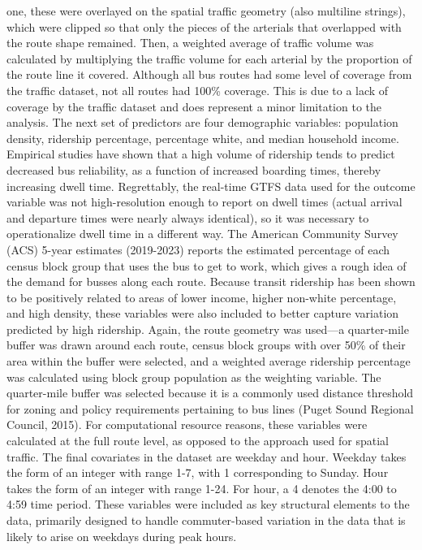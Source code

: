 \documentclass[
  12pt,
]{article}
\begin{document}
one, these were overlayed on the spatial traffic geometry (also
multiline strings), which were clipped so that only the pieces of the
arterials that overlapped with the route shape remained. Then, a
weighted average of traffic volume was calculated by multiplying the
traffic volume for each arterial by the proportion of the route line it
covered. Although all bus routes had some level of coverage from the
traffic dataset, not all routes had 100\% coverage. This is due to a
lack of coverage by the traffic dataset and does represent a minor
limitation to the analysis. The next set of predictors are four
demographic variables: population density, ridership percentage,
percentage white, and median household income. Empirical studies have
shown that a high volume of ridership tends to predict decreased bus
reliability, as a function of increased boarding times, thereby
increasing dwell time. Regrettably, the real-time GTFS data used for the
outcome variable was not high-resolution enough to report on dwell times
(actual arrival and departure times were nearly always identical), so it
was necessary to operationalize dwell time in a different way. The
American Community Survey (ACS) 5-year estimates (2019-2023) reports the
estimated percentage of each census block group that uses the bus to get
to work, which gives a rough idea of the demand for busses along each
route. Because transit ridership has been shown to be positively related
to areas of lower income, higher non-white percentage, and high density,
these variables were also included to better capture variation predicted
by high ridership. Again, the route geometry was used---a quarter-mile
buffer was drawn around each route, census block groups with over 50\%
of their area within the buffer were selected, and a weighted average
ridership percentage was calculated using block group population as the
weighting variable. The quarter-mile buffer was selected because it is a
commonly used distance threshold for zoning and policy requirements
pertaining to bus lines (Puget Sound Regional Council, 2015). For
computational resource reasons, these variables were calculated at the
full route level, as opposed to the approach used for spatial traffic.
The final covariates in the dataset are weekday and hour. Weekday takes
the form of an integer with range 1-7, with 1 corresponding to Sunday.
Hour takes the form of an integer with range 1-24. For hour, a 4 denotes
the 4:00 to 4:59 time period. These variables were included as key
structural elements to the data, primarily designed to handle
commuter-based variation in the data that is likely to arise on weekdays
during peak hours.
\end{document}
